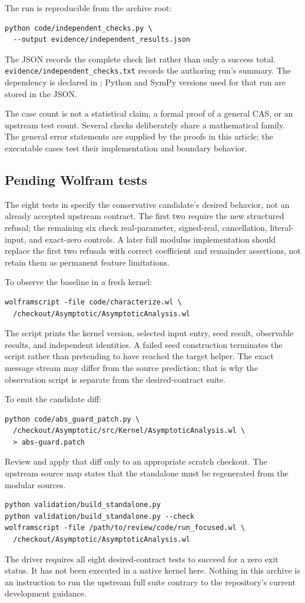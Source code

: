 \documentclass[11pt]{article}
\newcommand{\code}[1]{\texttt{\detokenize{#1}}}
\theoremstyle{remark}\newtheorem{remark}[theorem]{Remark}
\begin{document}
The run is reproducible from the archive root:
\begin{lstlisting}
python code/independent_checks.py \
  --output evidence/independent_results.json
\end{lstlisting}
The JSON records the complete check list rather than only a success total.
\nolinkurl{evidence/independent_checks.txt} records the authoring run's summary.
The dependency is declared in \code{code/requirements.txt}; Python and SymPy
versions used for that run are stored in the JSON.

The case count is not a statistical claim, a formal proof of a general CAS,
or an upstream test count. Several checks deliberately share a mathematical
family. The general error statements are supplied by the proofs in this
article; the executable cases test their implementation and boundary behavior.

\subsection{Pending Wolfram tests}
The eight tests in \code{AbsGuardRegressions.wlt} specify the conservative
candidate's desired behavior, not an already accepted upstream contract.
The first two require the new structured refusal; the remaining six check
real-parameter, signed-real, cancellation, literal-input, and exact-zero controls.
A later full modulus implementation should replace the first two refusals with
correct coefficient and remainder assertions, not retain them as permanent
feature limitations.

To observe the baseline in a fresh kernel:
\begin{lstlisting}
wolframscript -file code/characterize.wl \
  /checkout/Asymptotic/AsymptoticAnalysis.wl
\end{lstlisting}
The script prints the kernel version, selected input entry, seed result,
observable results, and independent identities. A failed seed construction
terminates the script rather than pretending to have reached the target helper.
The exact message stream may differ from the source prediction; that is why the
observation script is separate from the desired-contract suite.

To emit the candidate diff:
\begin{lstlisting}
python code/abs_guard_patch.py \
  /checkout/Asymptotic/src/Kernel/AsymptoticAnalysis.wl \
  > abs-guard.patch
\end{lstlisting}
Review and apply that diff only to an appropriate scratch checkout. The upstream
source map states that the standalone must be regenerated from the modular
sources.\cite{sourcemap}
\begin{lstlisting}
python validation/build_standalone.py
python validation/build_standalone.py --check
wolframscript -file /path/to/review/code/run_focused.wl \
  /checkout/Asymptotic/AsymptoticAnalysis.wl
\end{lstlisting}
The driver requires all eight desired-contract tests to succeed for a zero exit
status. It has not been executed in a native kernel here. Nothing in this archive
is an instruction to run the upstream full suite contrary to the repository's
current development guidance.
\end{document}
